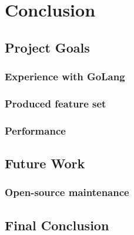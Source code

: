 \section{Conclusion}
\label{sec:Conclusion}

\subsection{Project Goals}
\label{sub:Project Goals}


\subsubsection{Experience with GoLang}
\label{subs:Experience with GoLang}


\subsubsection{Produced feature set}
\label{subs:Produced featureset}


\subsubsection{Performance}
\label{subs:Performance}


\subsection{Future Work}
\label{sub:Future Work}


\subsubsection{Open-source maintenance}
\label{subs:Open-source maintanance}


\subsection{Final Conclusion}
\label{sub:Final Conclusion}
